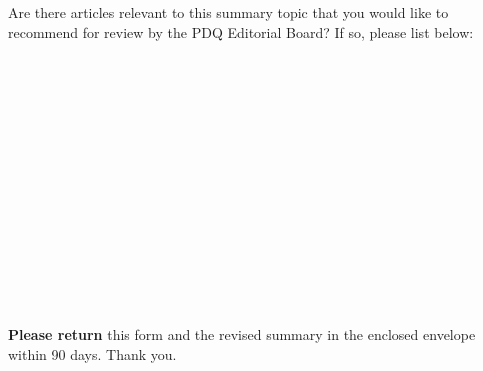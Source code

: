 \documentclass[letterpaper,12pt]{letter}
\begin{document}
Are there articles relevant to this summary topic that you would like to
recommend for review by the PDQ\textregistered{} Editorial Board?  If so,
please list below:

\vspace{12pt}

\makebox[6.5in]{\hrulefill} \\
\makebox[6.5in]{\hrulefill} \\
\makebox[6.5in]{\hrulefill} \\
\makebox[6.5in]{\hrulefill} \\
\makebox[6.5in]{\hrulefill} \\
\makebox[6.5in]{\hrulefill} \\
\makebox[6.5in]{\hrulefill} \\
\makebox[6.5in]{\hrulefill} \\
\makebox[6.5in]{\hrulefill} \\
\makebox[6.5in]{\hrulefill} \\
\makebox[6.5in]{\hrulefill} \\
\makebox[6.5in]{\hrulefill} \\
\makebox[6.5in]{\hrulefill} \\
\makebox[6.5in]{\hrulefill}

\vspace{12pt}

\textbf{Please return} this form and the revised summary in the enclosed 
envelope within 90 days.  Thank you.

\vfill
\end{document}
